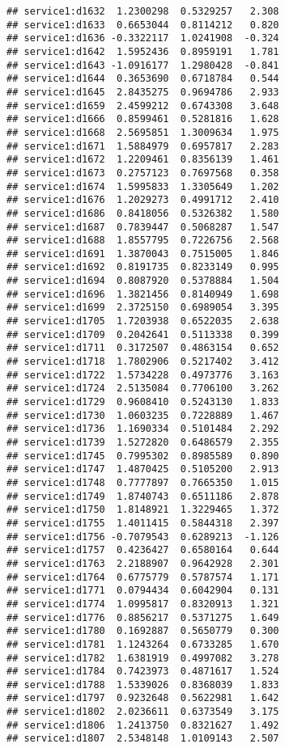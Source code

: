 \documentclass[
]{article}
\begin{document}
\begin{verbatim}
## service1:d1632  1.2300298  0.5329257   2.308
## service1:d1633  0.6653044  0.8114212   0.820
## service1:d1636 -0.3322117  1.0241908  -0.324
## service1:d1642  1.5952436  0.8959191   1.781
## service1:d1643 -1.0916177  1.2980428  -0.841
## service1:d1644  0.3653690  0.6718784   0.544
## service1:d1645  2.8435275  0.9694786   2.933
## service1:d1659  2.4599212  0.6743308   3.648
## service1:d1666  0.8599461  0.5281816   1.628
## service1:d1668  2.5695851  1.3009634   1.975
## service1:d1671  1.5884979  0.6957817   2.283
## service1:d1672  1.2209461  0.8356139   1.461
## service1:d1673  0.2757123  0.7697568   0.358
## service1:d1674  1.5995833  1.3305649   1.202
## service1:d1676  1.2029273  0.4991712   2.410
## service1:d1686  0.8418056  0.5326382   1.580
## service1:d1687  0.7839447  0.5068287   1.547
## service1:d1688  1.8557795  0.7226756   2.568
## service1:d1691  1.3870043  0.7515005   1.846
## service1:d1692  0.8191735  0.8233149   0.995
## service1:d1694  0.8087920  0.5378884   1.504
## service1:d1696  1.3821456  0.8140949   1.698
## service1:d1699  2.3725150  0.6989054   3.395
## service1:d1705  1.7203938  0.6522035   2.638
## service1:d1709  0.2042641  0.5113338   0.399
## service1:d1711  0.3172507  0.4863154   0.652
## service1:d1718  1.7802906  0.5217402   3.412
## service1:d1722  1.5734228  0.4973776   3.163
## service1:d1724  2.5135084  0.7706100   3.262
## service1:d1729  0.9608410  0.5243130   1.833
## service1:d1730  1.0603235  0.7228889   1.467
## service1:d1736  1.1690334  0.5101484   2.292
## service1:d1739  1.5272820  0.6486579   2.355
## service1:d1745  0.7995302  0.8985589   0.890
## service1:d1747  1.4870425  0.5105200   2.913
## service1:d1748  0.7777897  0.7665350   1.015
## service1:d1749  1.8740743  0.6511186   2.878
## service1:d1750  1.8148921  1.3229465   1.372
## service1:d1755  1.4011415  0.5844318   2.397
## service1:d1756 -0.7079543  0.6289213  -1.126
## service1:d1757  0.4236427  0.6580164   0.644
## service1:d1763  2.2188907  0.9642928   2.301
## service1:d1764  0.6775779  0.5787574   1.171
## service1:d1771  0.0794434  0.6042904   0.131
## service1:d1774  1.0995817  0.8320913   1.321
## service1:d1776  0.8856217  0.5371275   1.649
## service1:d1780  0.1692887  0.5650779   0.300
## service1:d1781  1.1243264  0.6733285   1.670
## service1:d1782  1.6381919  0.4997082   3.278
## service1:d1784  0.7423973  0.4871617   1.524
## service1:d1788  1.5339026  0.8368039   1.833
## service1:d1797  0.9232648  0.5622981   1.642
## service1:d1802  2.0236611  0.6373549   3.175
## service1:d1806  1.2413750  0.8321627   1.492
## service1:d1807  2.5348148  1.0109143   2.507

\end{verbatim}
\end{document}
